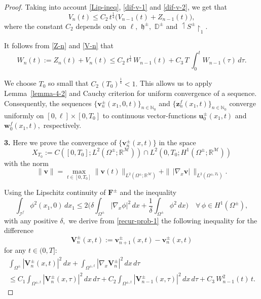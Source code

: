 \documentclass[reqno]{amsart}            %
\numberwithin{equation}{section}
\begin{document}
\begin{proof}
		Taking into account \eqref{Lip-ineq}, \eqref{dif-v-1} and \eqref{dif-v-2}, we get that
		\begin{equation}\label{V-n}
			V_n(t) \le C_2 \, t^{\frac{1}{4}} \Big(V_{n-1}(t) + Z_{n-1}(t)\Big),	
		\end{equation} 
		where the constant $C_2$ depends only on $\ell,$ $\mathfrak{h}^\pm,$ $\mathbb{D}^\pm$ and $\upharpoonleft\!\! {S}^\pm\!\!\upharpoonright_1.$
		
		It follows from \eqref{Z-n} and \eqref{V-n} that
		\begin{equation}\label{W-n}
			W_n(t) := Z_n(t) + V_n(t) \le C_2 \, t^{\frac{1}{4}} \, W_{n-1}(t) + C_3 \, T \, \int_{0}^{t} W_{n-1}(\tau)\, d\tau. 	
		\end{equation}
		
		We choose $T_0$ so small that $C_2\, (T_0)^{\frac{1}{4}} < 1.$ This allows us to apply Lemma~\ref{lemma-4-2} and 
		Cauchy criterion for uniform convergence of a sequence. Consequently, the sequences
		$\{\mathbf{v}^\pm_n(x_1, 0, t)\}_{n\in \mathbb N_0}$ and $\{\mathbf{z}^f_n(x_1,t)\}_{n\in \mathbb N_0}$ converge uniformly on $[0, \ell] \times [0, T_0]$ to continuous vector-functions $\mathbf{u}^\pm_0(x_1,t)$ and $\mathbf{w}^f_0(x_1, t),$ respectively.
		
		\smallskip
		\noindent
		{\bf 3.} Here we prove the convergence of $\{\mathbf{v}^\pm_n(x, t)\}$ 
		in the space 
		$$
		X_{T_0} := C([0, T_0]; L^2(\Omega^\pm; \mathbb{R}^\mathcal{M})) \cap L^2(0, T_0; H^1(\Omega^\pm; \mathbb{R}^\mathcal{M}))
		$$
		with the norm
		$$
		\|\mathbf{v}\| = \max_{t\in [0,T_0]} \|\mathbf{v}(t)\|_{L^2(\Omega^\pm; \mathbb{R}^\mathcal{M})} +
		\|\, |\nabla_x \mathbf{v}|\, \|_{L^2(\Omega^{\pm,T_0})}.  
		$$
		
		Using  the Lipschitz continuity of $\mathbf{F}^\pm$ and the inequality 
		$$
		\int_{\mathcal{I}^f} \phi^2(x_1,0)\, dx_1  \le 2 \Bigg(\delta \int_{\Omega^\pm}|\nabla_x\phi|^2 \, dx + \frac{1}{\delta} \int_{\Omega^\pm}\phi^2 \, dx \Bigg) \quad \forall\, \phi \in H^1(\Omega^\pm),
		$$
		with any positive $\delta,$  we derive from  \eqref{recur-prob-1} the following inequality for the difference
		\begin{equation}\label{deffer-V_n}
			\mathbf{V}^\pm_n(x,t):= \mathbf{v}^\pm_{n+1}(x,t) - \mathbf{v}^\pm_n(x,t) 
		\end{equation}
		for any $t \in (0, T]$: 
		\begin{multline}\label{app-1}
			\int_{\Omega^\pm} |\mathbf{V}^\pm_n(x,t)|^2\, dx + \int_{\Omega^{\pm, t}} |\nabla_x \mathbf{V}^\pm_n|^2 \, dx\, d\tau 
			\\
			\le C_1 \int_{\Omega^{\pm, t}} |\mathbf{V}^\pm_n(x,\tau)|^2 \, dx\, d\tau + C_2 \int_{\Omega^{\pm, t}} |\mathbf{V}^\pm_{n-1}(x,\tau)|^2 \, dx\, d\tau + C_3 \, W^2_{n-1}(t) \, t.  
		\end{multline}
		

\end{proof}
\end{document}

